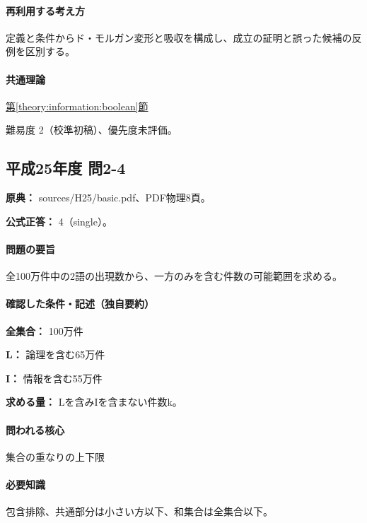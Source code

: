 \paragraph{再利用する考え方} 定義と条件からド・モルガン変形と吸収を構成し、成立の証明と誤った候補の反例を区別する。

\paragraph{共通理論} \hyperref[theory:information:boolean]{第\ref*{theory:information:boolean}節}

\par 難易度 2（校準初稿）、優先度未評価。

\subsection{平成25年度 問2-4}
\label{q:h25-reg-basic-2-4}

\noindent\textbf{原典：} sources/H25/basic.pdf、PDF物理8頁。

\textbf{公式正答：} 4（single）。

\paragraph{問題の要旨} 全100万件中の2語の出現数から、一方のみを含む件数の可能範囲を求める。

\paragraph{確認した条件・記述（独自要約）}\mbox{}\par

\noindent\textbf{全集合：} 100万件\par

\noindent\textbf{L：} 論理を含む65万件\par

\noindent\textbf{I：} 情報を含む55万件\par

\noindent\textbf{求める量：} Lを含みIを含まない件数k。\par

\paragraph{問われる核心} 集合の重なりの上下限

\paragraph{必要知識} 包含排除、共通部分は小さい方以下、和集合は全集合以下。

